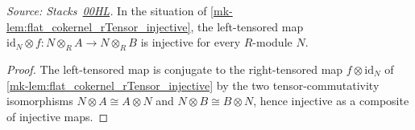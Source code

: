 \begin{lemma}\label{mk-lem:flat_cokernel_lTensor_injective}
  \leanok

  \textit{Source: Stacks~\href{https://stacks.math.columbia.edu/tag/00HL}{00HL}.}
  In the situation of \ref{mk-lem:flat_cokernel_rTensor_injective}, the
  left-tensored map \(\mathrm{id}_N \otimes f : N \otimes_R A \to N \otimes_R
  B\) is injective for every \(R\)-module \(N\).
\end{lemma}
\begin{proof}
  \leanok{}
  The left-tensored map is conjugate to the right-tensored map
  \(f \otimes \mathrm{id}_N\) of \ref{mk-lem:flat_cokernel_rTensor_injective} by
  the two tensor-commutativity isomorphisms \(N \otimes A \cong A \otimes N\)
  and \(N \otimes B \cong B \otimes N\), hence injective as a composite of
  injective maps.
\end{proof}

